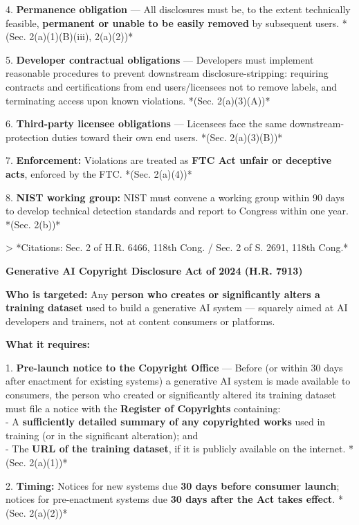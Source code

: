 \documentclass[11pt]{article}
\begin{document}
4. \textbf{Permanence obligation} --- All disclosures must be, to the extent technically feasible, \textbf{permanent or unable to be easily removed} by subsequent users. *(Sec. 2(a)(1)(B)(iii), 2(a)(2))*

5. \textbf{Developer contractual obligations} --- Developers must implement reasonable procedures to prevent downstream disclosure-stripping: requiring contracts and certifications from end users/licensees not to remove labels, and terminating access upon known violations. *(Sec. 2(a)(3)(A))*

6. \textbf{Third-party licensee obligations} --- Licensees face the same downstream-protection duties toward their own end users. *(Sec. 2(a)(3)(B))*

7. \textbf{Enforcement:} Violations are treated as \textbf{FTC Act unfair or deceptive acts}, enforced by the FTC. *(Sec. 2(a)(4))*

8. \textbf{NIST working group:} NIST must convene a working group within 90 days to develop technical detection standards and report to Congress within one year. *(Sec. 2(b))*

\textgreater{} *Citations: Sec. 2 of H.R. 6466, 118th Cong. / Sec. 2 of S. 2691, 118th Cong.*

\textbf{Generative AI Copyright Disclosure Act of 2024 (H.R. 7913)}

\textbf{Who is targeted:} Any \textbf{person who creates or significantly alters a training dataset} used to build a generative AI system --- squarely aimed at AI developers and trainers, not at content consumers or platforms.

\textbf{What it requires:}

1. \textbf{Pre-launch notice to the Copyright Office} --- Before (or within 30 days after enactment for existing systems) a generative AI system is made available to consumers, the person who created or significantly altered its training dataset must file a notice with the \textbf{Register of Copyrights} containing: \\
   - A \textbf{sufficiently detailed summary of any copyrighted works} used in training (or in the significant alteration); and \\
   - The \textbf{URL of the training dataset}, if it is publicly available on the internet. *(Sec. 2(a)(1))*

2. \textbf{Timing:} Notices for new systems due \textbf{30 days before consumer launch}; notices for pre-enactment systems due \textbf{30 days after the Act takes effect}. *(Sec. 2(a)(2))*
\end{document}
